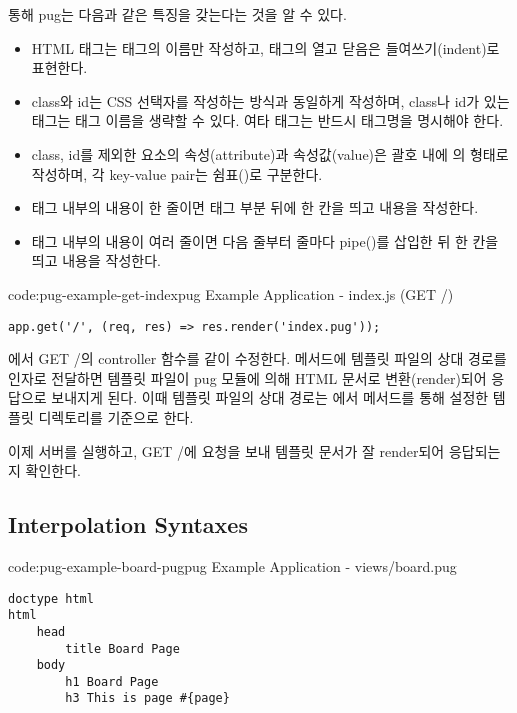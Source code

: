 \를 통해 pug는 다음과 같은 특징을 갖는다는 것을 알 수 있다.

\begin{itemize}
    \item HTML 태그는 태그의 이름만 작성하고, 태그의 열고 닫음은 들여쓰기(indent)로 표현한다.
    \item class와 id는 CSS 선택자를 작성하는 방식과 동일하게 작성하며, class나 id가 있는  태그는 태그 이름을 생략할 수 있다. 여타 태그는 반드시 태그명을 명시해야 한다.
    \item class, id를 제외한 요소의 속성(attribute)과 속성값(value)은 괄호 내에 의 형태로 작성하며, 각 key-value pair는 쉼표(\cd{,})로 구분한다.
    \item 태그 내부의 내용이 한 줄이면 태그 부분 뒤에 한 칸을 띄고 내용을 작성한다.
    \item 태그 내부의 내용이 여러 줄이면 다음 줄부터 줄마다 pipe(\cd{|})를 삽입한 뒤 한 칸을 띄고 내용을 작성한다.
\end{itemize}

\begin{codeenv}{code:pug-example-get-index}{pug Example Application - index.js (GET /)}\begin{verbatim}
app.get('/', (req, res) => res.render('index.pug'));
\end{verbatim}
\end{codeenv}

에서 GET /의 controller 함수를 \와 같이 수정한다.  메서드에 템플릿 파일의 상대 경로를 인자로 전달하면 템플릿 파일이 pug 모듈에 의해 HTML 문서로 변환(render)되어 응답으로 보내지게 된다. 이때 템플릿 파일의 상대 경로는 에서  메서드를 통해 설정한 템플릿 디렉토리를 기준으로 한다.

이제 서버를 실행하고, GET /에 요청을 보내 템플릿 문서가 잘 render되어 응답되는지 확인한다.

\subsection*{Interpolation Syntaxes}

\begin{codeenv}{code:pug-example-board-pug}{pug Example Application - views/board.pug}\begin{verbatim}
doctype html
html
    head
        title Board Page
    body
        h1 Board Page
        h3 This is page #{page}
\end{verbatim}
\end{codeenv}

